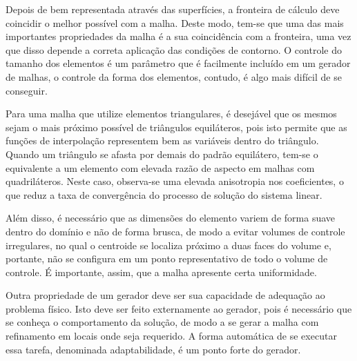 Depois de bem representada através das superfícies, a fronteira de cálculo deve coincidir o melhor possível com a malha. Deste modo, tem-se que uma das mais importantes propriedades da malha é a sua coincidência com a fronteira, uma vez que disso depende a correta aplicação das condições de contorno. O controle do tamanho dos elementos é um parâmetro que é facilmente incluído em um gerador de malhas, o controle da forma dos elementos, contudo, é algo mais difícil de se conseguir.

Para uma malha que utilize elementos triangulares, é desejável que os mesmos sejam o mais próximo possível de triângulos equiláteros, pois isto permite que as funções de interpolação representem bem as variáveis dentro do triângulo. Quando um triângulo se afasta por demais do padrão equilátero, tem-se o equivalente a um elemento com elevada razão de aspecto em malhas com quadriláteros. Neste caso, observa-se uma elevada anisotropia nos coeficientes, o que reduz a taxa de convergência do processo de solução do sistema linear.

Além disso, é necessário que as dimensões do elemento variem de forma suave dentro do domínio e não de forma brusca, de modo a evitar volumes de controle irregulares, no qual o centroide se localiza próximo a duas faces do volume e, portante, não se configura em um ponto representativo de todo o volume de controle. É importante, assim, que a malha apresente certa uniformidade.

Outra propriedade de um gerador deve ser sua capacidade de adequação ao problema físico. Isto deve ser feito externamente ao gerador, pois é necessário que se conheça o comportamento da solução, de modo a se gerar a malha com refinamento em locais onde seja requerido. A forma automática de se executar essa tarefa, denominada adaptabilidade, é um ponto forte do gerador.

